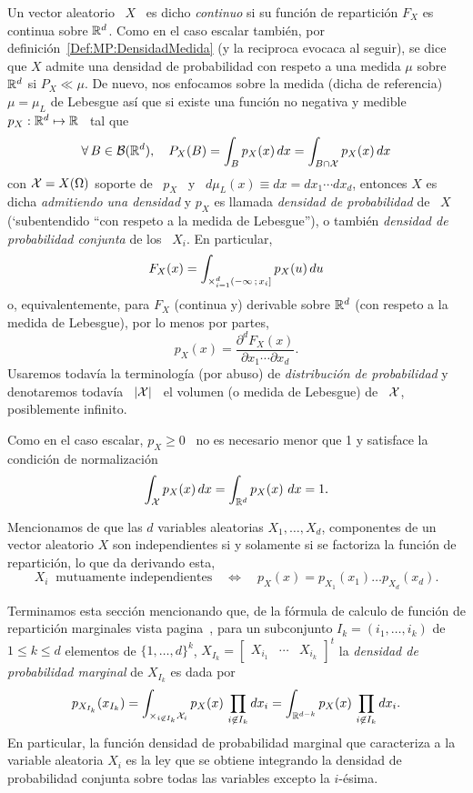 \begin{definicion}
  Un  vector aleatorio  \  $X$ \  es dicho  {\it  continuo} si  su funci\'on  de
  repartici\'on  $F_X$ es  continua sobre  $\mathbb{R}^d$.  Como  en el  caso escalar
  tambi\'en,   por  definici\'on~\ref{Def:MP:DensidadMedida}  (y   la  reciproca
  evocaca al  seguir), se dice que  $X$ admite una densidad  de probabilidad con
  respeto a  una medida $\mu$ sobre $\mathbb{R}^d$  si $P_X \ll \mu$.   De nuevo, nos
  enfocamos  sobre la medida  (dicha de  referencia) $\mu  = \mu_L$  de Lebesgue
  as\'i  que si  existe una  funci\'on  no negativa  y medible  \ $p_X:  \mathbb{R}^d
  \mapsto \mathbb{R}$ \ tal que
  \[
  \forall \,  B \in \mathcal{B}(\mathbb{R}^d),  \quad P_X(B) =  \int_B p_X(x) \, dx  = \int_{B
    \cap \mathcal{X}} p_X(x) \, dx
  \]
  con $\mathcal{X}  = X(\Omega)$ soporte  de \ $p_X$  \ y \  $d\mu_L(x) \equiv dx  = dx_1
  \cdots dx_d$, entonces  $X$ es dicha {\it admitiendo una  densidad} y $p_X$ es
  llamada {\it densidad de probabilidad} de \ $X$ (`subentendido ``con respeto a
  la medida de Lebesgue''), o  tambi\'en {\it densidad de probabilidad conjunta}
  de los \ $X_i$. En particular,
  \[
  F_X(x) =  \int_{\operatorname*{\times}_{i=1}^d (-\infty \, ;  \, x_i]} p_X(u) \, du
  \]
  o, equivalentemente,  para $F_X$ (continua  y) derivable sobre  $\mathbb{R}^d$ (con
  respeto a la medida de Lebesgue), por lo menos por partes,
  \[
  p_X(x) = \frac{\partial^d F_X(x)}{\partial x_1 \cdots \partial x_d}.
  \]
  Usaremos  todav\'ia la terminolog\'ia  (por abuso)  de {\it  distribuci\'on de
    probabilidad} y  denotaremos todav\'ia  \ $|\mathcal{X}|$ \  el volumen (o  medida de
  Lebesgue) de \ $\mathcal{X}$, posiblemente infinito.
\end{definicion}

Como en el caso  escalar, $p_X \ge 0$ \ no es necesario  menor que 1 y satisface
la condici\'on de normalizaci\'on
%
\[
\int_{\mathcal{X}} p_X(x) \, dx = \int_{\mathbb{R}^d} p_X(x) \ dx  = 1.
\]

Mencionamos de que las $d$  variables aleatorias $X_1, \ldots, X_d$, componentes
de un vector aleatorio $X$ son  independientes si y solamente si se factoriza la
funci\'on de repartici\'on, lo que da derivando esta,
%
\[
X_i \:  \mbox{ mutuamente independientes} \quad \Leftrightarrow  \quad p_X(x) =
p_{X_1}(x_1) \ldots p_{X_d}(x_d).
\]


Terminamos esta secci\'on mencionando que, de la f\'ormula de calculo de funci\'on
de  repartici\'on marginales vista  pagina~\pageref{Pagina:MP:MarginalesF}, para
un subconjunto $I_k = (i_1,\ldots,i_k)$ de $1  \le k \le d$ elementos de $\{ 1 ,
\ldots   ,  d   \}^k$,   $X_{I_k}   =  \begin{bmatrix}   X_{i_1}   &  \cdots   &
  X_{i_k}\end{bmatrix}^t$  la   {\it  densidad  de   probabilidad  marginal}  de
$X_{I_k}$ es dada por
%
\[
p_{X_{I_k}}(x_{I_k})  = \int_{\times_{i  \not\in  I_k} \mathcal{X}_i}  p_X(x) \,  \prod_{i
    \not\in I_k}  dx_i =  \int_{\mathbb{R}^{d-k}} p_X(x) \,  \prod_{i \not\in
      I_k} dx_i.
\]
%
En particular, la funci\'on densidad  de probabilidad marginal que caracteriza a
la variable aleatoria  $X_i$ es la ley que se obtiene  integrando la densidad de
probabilidad conjunta sobre todas las variables excepto la $i$-\'esima.

